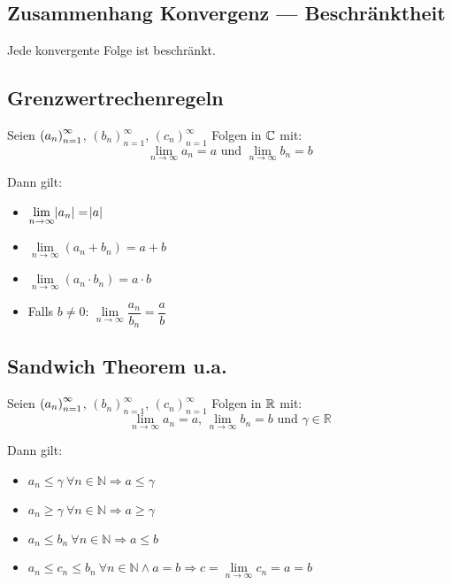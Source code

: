 \subsection{Zusammenhang Konvergenz --- Beschränktheit}
Jede konvergente Folge ist beschränkt.

\subsection{Grenzwertrechenregeln}
Seien ${(a_n)}_{n=1}^\infty$, ${(b_n)}_{n=1}^\infty$, ${(c_n)}_{n=1}^\infty$ Folgen
in $\mathbb{C}$ mit:
\begin{equation*}
    \lim_{n \rightarrow \infty} a_n = a \text{ und }
    \lim_{n \rightarrow \infty} b_n = b
\end{equation*}

Dann gilt:

\begin{itemize}
    \item $\lim\limits_{n \rightarrow \infty} \abs{a_n} = \abs{a}$
    \item $\lim\limits_{n \rightarrow \infty}(a_n + b_n) = a + b$
    \item $\lim\limits_{n \rightarrow \infty}(a_n \cdot b_n) = a \cdot b$
    \item Falls $b \neq 0$:
    $\lim\limits_{n \rightarrow \infty}\dfrac{a_n}{b_n} = \dfrac{a}{b}$
\end{itemize}

\subsection{Sandwich Theorem u.a.}
Seien ${(a_n)}_{n=1}^\infty$, ${(b_n)}_{n=1}^\infty$, ${(c_n)}_{n=1}^\infty$
Folgen in $\mathbb{R}$ mit:
\begin{equation*}
    \lim_{n \rightarrow \infty}a_n = a \text{, }
    \lim_{n \rightarrow \infty}b_n = b \text{ und } \gamma \in \mathbb{R}
\end{equation*}

Dann gilt:

\begin{itemize}
    \item $a_n \leq \gamma\ \forall n \in \mathbb{N} \Rightarrow a \leq \gamma$
    \item $a_n \geq \gamma\ \forall n \in \mathbb{N} \Rightarrow a \geq \gamma$
    \item $a_n \leq b_n\ \forall n \in \mathbb{N} \Rightarrow a \leq b$
    \item $a_n \leq c_n \leq b_n\ \forall n \in \mathbb{N} \wedge a=b
    \Rightarrow c=\lim\limits_{n \rightarrow \infty} c_n = a = b$
\end{itemize}


